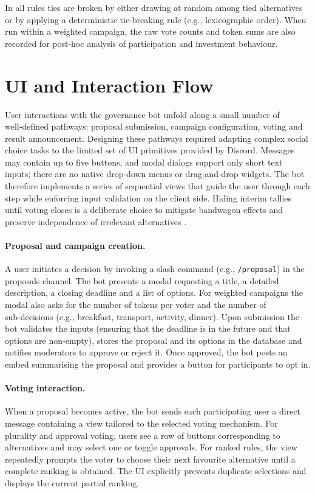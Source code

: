 In all rules ties are broken by either drawing at random among tied
alternatives or by applying a deterministic tie‑breaking rule (e.g.,
lexicographic order).  When run within a weighted campaign, the raw
vote counts and token sums are also recorded for post‑hoc analysis of
participation and investment behaviour.

\section{UI and Interaction Flow}

User interactions with the governance bot unfold along a small number of
well‑defined pathways: proposal submission, campaign configuration,
voting and result announcement.  Designing these pathways required
adapting complex social choice tasks to the limited set of UI
primitives provided by Discord.  Messages may contain up to five
buttons, and modal dialogs support only short text inputs; there are no
native drop‑down menus or drag‑and‑drop widgets.  The bot therefore
implements a series of sequential views that guide the user through each
step while enforcing input validation on the client side.  Hiding
interim tallies until voting closes is a deliberate choice to mitigate
bandwagon effects and preserve independence of irrelevant alternatives
\cite{Arrow1951}.

\paragraph{Proposal and campaign creation.}  A user initiates a decision
by invoking a slash command (e.g., \texttt{/proposal}) in the proposals
channel.  The bot presents a modal requesting a title, a detailed
description, a closing deadline and a list of options.  For weighted
campaigns the modal also asks for the number of tokens per voter and the
number of sub‑decisions (e.g., breakfast, transport, activity, dinner).
Upon submission the bot validates the inputs (ensuring that the deadline
is in the future and that options are non‑empty), stores the proposal
and its options in the database and notifies moderators to approve or
reject it.  Once approved, the bot posts an embed summarising the
proposal and provides a button for participants to opt in.

\paragraph{Voting interaction.}  When a proposal becomes active, the bot
sends each participating user a direct message containing a view tailored
to the selected voting mechanism.  For plurality and approval voting,
users see a row of buttons corresponding to alternatives and may select
one or toggle approvals.  For ranked rules, the view repeatedly
prompts the voter to choose their next favourite alternative until a
complete ranking is obtained.  The UI explicitly prevents
duplicate selections and displays the current partial ranking.

